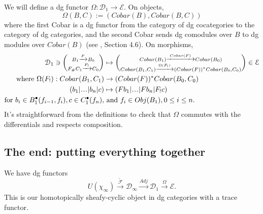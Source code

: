 We will define a dg functor $\Omega: 
\mathcal{D}_1 \to \mathcal{E}$. 
On objects, $$\Omega(B,C) := 
(Cobar(B), Cobar(B,C))$$ where the first 
Cobar is a dg functor from the category of 
dg cocategories to the category of dg 
categories, and the second Cobar sends 
dg comodules over $B$ to dg modules over 
$Cobar(B)$ (see \cite{T}, Section 4.6). 
On morphisms, 
\begin{align*}
\mathcal{D}_1 \ni
\bigg(\substack{
	B_1 \xrightarrow{F} B_0\\
	F_\# C_1 \xrightarrow{F_!} C_0}\bigg)
& \mapsto
\bigg(\substack{
  Cobar(B_1)\xrightarrow{Cobar(F)}Cobar(B_0)\\
  Cobar(B_1,C_1) \xrightarrow{\Omega(F_!)} 
  (Cobar(F))^*Cobar(B_0,C_0)}\bigg)
\in \mathcal{E}  \\
\textrm{where } 
\Omega(F_!): Cobar(B_1,C_1)
& \to
(Cobar(F))^*Cobar(B_0,C_0)\\
(b_1|\smdots|b_n|c)
&\mapsto
(Fb_1|\smdots|Fb_n|F_!c)\\
\textrm{for } 
  b_i \in B_1^\bullet(f_{i-1},f_i),
  c \in C_1^\bullet(f_n), 
&\textrm{ and } f_i \in 
  Obj(B_1), 0 \leq i \leq n.
\end{align*}
It's straightforward from the definitions 
to check that $\Omega$ commutes with 
the differentials and respects composition.

\subsection{The end: putting everything together}
We have dg functors
$$
U(\chi_\infty) \xrightarrow{\tilde{\mathcal{F}}}
\mathcal{D}_\infty \xrightarrow{Adj}
\mathcal{D}_1 \xrightarrow{\Omega}
\mathcal{E}.
$$
This is our homotopically sheafy-cyclic object 
in dg categories with a trace functor.